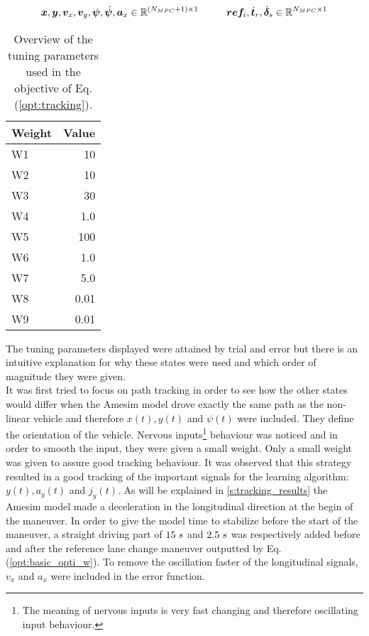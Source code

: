 \[\bm{x},\bm{y},\bm{v}_x,\bm{v}_y,\bm{\psi},\dot{\bm{\psi}},\bm{a}_x \in \mathbb{R}^{(N_{MPC}+1)\times1} \hspace{10mm}\bm{ref}_{i},\dot{\bm{t}}_r,\dot{\bm{\delta}}_s \in \mathbb{R}^{N_{MPC}\times1}\]


\begin{table}[h!]
	\centering
	\begin{tabular}{@{}lr@{}} 
		Weight    & Value\\ \midrule
		W1      & 10\\
		W2          & 10\\
		W3 	   & 30\\
		W4       & 1.0\\
		W5       & 100\\
		W6       & 1.0\\
		W7       & 5.0\\
		W8       & 0.01\\
		W9  & 0.01\\ \bottomrule
	\end{tabular}
	\caption{Overview of the tuning parameters used in the objective of Eq. (\ref{opt:tracking}).}
	\label{tab:weights}
\end{table}
\newpage
The tuning parameters displayed were attained by trial and error but there is an intuitive explanation for why these states were used and which order of magnitude they were given.\\

It was first tried to focus on path tracking in order to see how the other states would differ when the Amesim model drove exactly the same path as the non-linear vehicle and therefore $x(t),y(t)$ and $\psi(t)$ were included. They define the orientation of the vehicle. Nervous inputs\footnote{The meaning of nervous inputs is very fast changing and therefore oscillating input behaviour.} behaviour was noticed and in order to smooth the input, they were given a small weight. Only a small weight was given to assure good tracking behaviour. It was observed that this strategy resulted in a good tracking of the important signals for the learning algorithm: $y(t), a_y(t)$ and $j_y(t)$. As will be explained in \ref{s:tracking_results} the Amesim model made a deceleration in the longitudinal direction at the begin of the maneuver. In order to  give the model time to stabilize before the start of the maneuver, a straight driving part of $15\hspace{1mm}s$ and $2.5\hspace{1mm}s$ was respectively added before and after the reference lane change maneuver outputted by Eq. (\ref{opt:basic_opti_w}). To remove the oscillation faster of the longitudinal signals, $v_x$ and $a_x$ were included in the error function.\\

